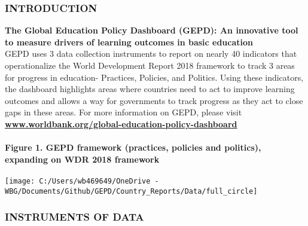 \documentclass[twocolumn]{article}
\author{}
\date{\vspace{-2.5em}}
\let\oldparagraph\paragraph
\renewcommand{\paragraph}[1]{\oldparagraph{#1}\mbox{}}
\begin{document}
\newcommand{\greynote}[1]{
    {\scriptsize
    \textcolor{darkgray}{\textit{Notes:} #1}
  }
}

\newcommand{\greysource}[1]{
    {\scriptsize
    \textcolor{darkgray}{\textit{Source:} #1}
  }
}

\newcommand{\greydisclaimer}[1]{
    {\scriptsize
    \textcolor{darkgray}{\textit{Disclaimer:} #1}
  }
}

\newcommand*{\tabindent}{\hspace{1mm}}

\hypertarget{introduction}{%
\subsubsection{\texorpdfstring{\textbf{INTRODUCTION}}{INTRODUCTION}}\label{introduction}}

\textbf{The Global Education Policy Dashboard (GEPD): An innovative tool
to measure drivers of learning outcomes in basic education}\\
GEPD uses 3 data collection instruments to report on nearly 40
indicators that operationalize the World Development Report 2018
framework to track 3 areas for progress in education- Practices,
Policies, and Politics. Using these indicators, the dashboard highlights
areas where countries need to act to improve learning outcomes and
allows a way for governments to track progress as they act to close gaps
in these areas. For more information on GEPD, please visit
\textbf{\href{https://www.worldbank.org/en/topic/education/brief/global-education-policy-dashboard}{www.worldbank.org/global-education-policy-dashboard}}

\hypertarget{figure-1.-gepd-framework-practices-policies-and-politics-expanding-on-wdr-2018-framework}{%
\paragraph{Figure 1. GEPD framework (practices, policies and politics),
expanding on WDR 2018
framework}\label{figure-1.-gepd-framework-practices-policies-and-politics-expanding-on-wdr-2018-framework}}

\begin{center}\texttt{[image: C:/Users/wb469649/OneDrive - WBG/Documents/Github/GEPD/Country\_Reports/Data/full\_circle]} \end{center}

\hypertarget{instruments-of-data}{%
\subsubsection{\texorpdfstring{\textbf{INSTRUMENTS OF
DATA}}{INSTRUMENTS OF DATA}}\label{instruments-of-data}}
\end{document}

